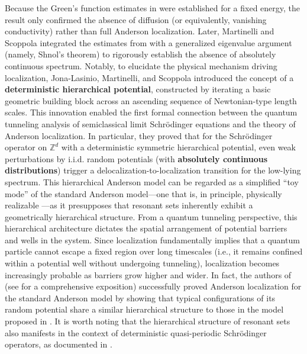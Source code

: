 \documentclass[11pt,reqno,UTF8,twoside]{amsart}
\newcommand{\Z}{\mathbb{Z}}
\theoremstyle{definition}
\numberwithin{equation}{section}
\begin{document}
Because the Green’s function estimates in \cite{FS83} were established for a fixed energy, the result only confirmed the absence of diffusion (or equivalently, vanishing conductivity) rather than full Anderson localization. Later, Martinelli and Scoppola \cite{MS85} integrated the estimates from \cite{FS83} with a generalized eigenvalue argument (namely, Shnol’s theorem) to rigorously establish the absence of absolutely continuous spectrum. Notably, to elucidate the physical mechanism driving localization, Jona-Lasinio, Martinelli, and Scoppola \cite{JLMS84,JLMS85} introduced the concept of a {\bf deterministic hierarchical potential}, constructed by iterating a basic geometric building block across an ascending sequence of Newtonian-type length scales. This innovation enabled the first formal connection between the quantum tunneling analysis of semiclassical limit Schrödinger equations \cite{JLMS81} and the theory of Anderson localization.  In particular, they proved that for the Schr\"odinger operator on $\Z^d$ with a deterministic symmetric hierarchical potential, even weak perturbations by i.i.d. random potentials (with \textbf{absolutely continuous distributions}) trigger a delocalization-to-localization transition for the low-lying spectrum. This hierarchical Anderson model can be regarded as a simplified ``toy mode'' of the standard Anderson model—one that is, in principle, physically realizable \cite{JLMS84,WSPZ89}—as it presupposes that resonant sets inherently exhibit a geometrically hierarchical structure. From a quantum tunneling perspective, this hierarchical architecture dictates the spatial arrangement of potential barriers and wells in the system. Since localization fundamentally implies that a quantum particle cannot escape a fixed region over long timescales (i.e., it remains confined within a potential well without undergoing tunneling), localization becomes increasingly probable as barriers grow higher and wider. In fact, the authors of \cite{FMSS85} (see \cite{MS87} for a comprehensive exposition) successfully proved Anderson localization for the standard Anderson model by showing that typical configurations of its random potential share a similar hierarchical structure to those in the model proposed in \cite{JLMS85}. It is worth noting that the hierarchical structure of resonant sets also manifests in the context of deterministic quasi-periodic Schrödinger operators, as documented in \cite{FSW90,BGS02,Bou07,CSZ23}.
\end{document}
